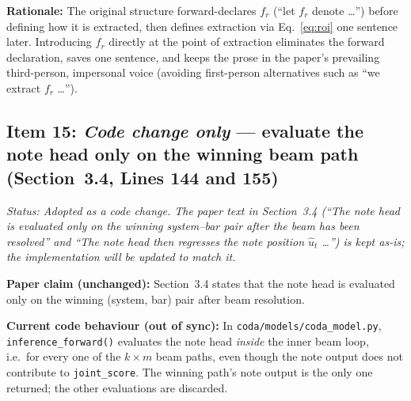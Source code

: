\documentclass{article}
\begin{document}
\textbf{Rationale:}
The original structure forward-declares $f_r$ (``let $f_r$ denote \ldots'') before defining how it is extracted, then defines extraction via Eq.~\ref{eq:roi} one sentence later. Introducing $f_r$ directly at the point of extraction eliminates the forward declaration, saves one sentence, and keeps the prose in the paper's prevailing third-person, impersonal voice (avoiding first-person alternatives such as ``we extract $f_r$ \ldots'').

\subsection*{Item 15: \emph{Code change only} --- evaluate the note head only on the winning beam path (Section~3.4, Lines 144 and 155)}

\textit{Status: Adopted as a code change. The paper text in Section~3.4 (``The note head is evaluated only on the winning system--bar pair after the beam has been resolved'' and ``The note head then regresses the note position $\hat{u}_t$ \ldots'') is kept as-is; the implementation will be updated to match it.}

\textbf{Paper claim (unchanged):}
Section~3.4 states that the note head is evaluated only on the winning (system, bar) pair after beam resolution.

\textbf{Current code behaviour (out of sync):}
In \texttt{coda/models/coda\_model.py}, \texttt{inference\_forward()} evaluates the note head \emph{inside} the inner beam loop, i.e.\ for every one of the $k \times m$ beam paths, even though the note output does not contribute to \texttt{joint\_score}. The winning path's note output is the only one returned; the other evaluations are discarded.
\end{document}
